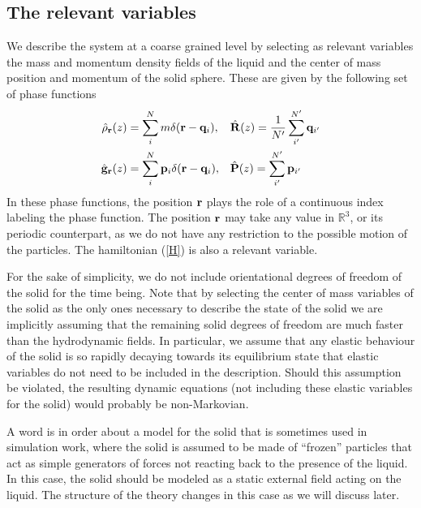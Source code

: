 \documentclass[a4paper,openright,12pt]{book}
\begin{document}
\subsection{The relevant variables}
We describe the system at a coarse grained level by selecting as
relevant variables the  mass and momentum density fields  of the liquid
and  the   center  of  mass   position  and  momentum  of   the  solid
sphere. These are given by the following set of phase functions 
\begin{align}
  \hat{\rho}_{\bf r}(z) &=\sum^{N}_im\delta({\bf r}-{\bf q}_i),
&&\hat{\bf R}(z)=\frac{1}{N'}\sum_{i'}^{N'}{\bf q}_{i'}
\nonumber\\
  \hat{\bf g}_{\bf r}(z) &=\sum^{N}_i{\bf p}_i\delta({\bf r}-{\bf q}_i),
&&\hat{\bf P}(z)=\sum_{i'}^{N'}{\bf p}_{i'}
\label{CGvar}
\end{align}
In these phase  functions, the position ${\bf r}$ plays  the role of a
continuous index labeling  the phase function. The  position ${\bf r}$
may take any value in  $\mathbb{R}^3$, or its periodic counterpart, as
we  do  not  have  any  restriction to  the  possible  motion  of  the
particles. The hamiltonian (\ref{H}) is also a relevant variable.

For the sake of simplicity, we do not include orientational degrees of
freedom of the  solid for the time being.  Note  that by selecting the
center of  mass variables of the  solid as the only  ones necessary to
describe the  state of the solid  we are implicitly assuming  that the
remaining  solid  degrees   of  freedom  are  much   faster  than  the
hydrodynamic  fields.   In  particular,  we assume  that  any  elastic
behaviour of the solid is  so rapidly decaying towards its equilibrium
state  that elastic  variables  do  not need  to  be  included in  the
description. Should this assumption be violated, the resulting dynamic
equations (not including  these elastic variables for the solid)
would probably  be non-Markovian.

A word is in order about a  model for the solid that is sometimes used
in  simulation work,  where the  solid  is  assumed to  be made  of
``frozen''  particles that  act  as simple  generators  of forces  not
reacting back  to the presence of  the liquid. In this  case, the solid
should be modeled as a static external field acting on the liquid. The
structure of the theory changes in this case as we will discuss later.
\end{document}
